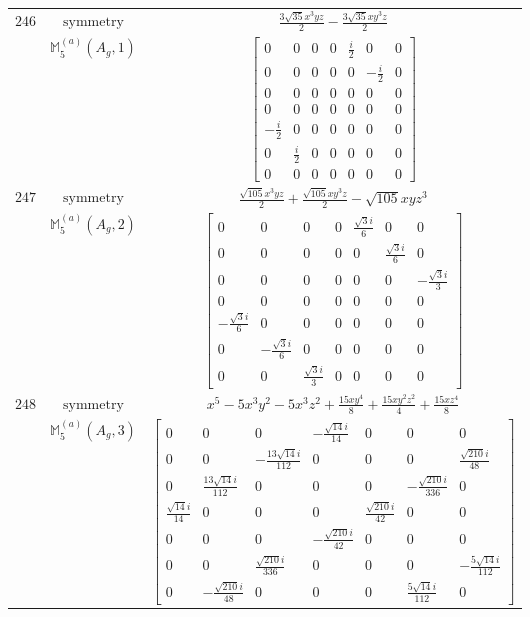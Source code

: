\documentclass[fleqn,8pt,landscape]{jsarticle}
\begin{document}
\begin{longtable}{ccc}
$ 246 $ & $ \text{symmetry} $ & $ \frac{3 \sqrt{35} x^{3} y z}{2} - \frac{3 \sqrt{35} x y^{3} z}{2} $ \\
$  $ & $ \mathbb{M}_{5}^{(a)}(A_{g},1) $ & $ \begin{bmatrix} 0 & 0 & 0 & 0 & \frac{i}{2} & 0 & 0 \\ 0 & 0 & 0 & 0 & 0 & - \frac{i}{2} & 0 \\ 0 & 0 & 0 & 0 & 0 & 0 & 0 \\ 0 & 0 & 0 & 0 & 0 & 0 & 0 \\ - \frac{i}{2} & 0 & 0 & 0 & 0 & 0 & 0 \\ 0 & \frac{i}{2} & 0 & 0 & 0 & 0 & 0 \\ 0 & 0 & 0 & 0 & 0 & 0 & 0 \end{bmatrix} $ \\ \hline
$ 247 $ & $ \text{symmetry} $ & $ \frac{\sqrt{105} x^{3} y z}{2} + \frac{\sqrt{105} x y^{3} z}{2} - \sqrt{105} x y z^{3} $ \\
$  $ & $ \mathbb{M}_{5}^{(a)}(A_{g},2) $ & $ \begin{bmatrix} 0 & 0 & 0 & 0 & \frac{\sqrt{3} i}{6} & 0 & 0 \\ 0 & 0 & 0 & 0 & 0 & \frac{\sqrt{3} i}{6} & 0 \\ 0 & 0 & 0 & 0 & 0 & 0 & - \frac{\sqrt{3} i}{3} \\ 0 & 0 & 0 & 0 & 0 & 0 & 0 \\ - \frac{\sqrt{3} i}{6} & 0 & 0 & 0 & 0 & 0 & 0 \\ 0 & - \frac{\sqrt{3} i}{6} & 0 & 0 & 0 & 0 & 0 \\ 0 & 0 & \frac{\sqrt{3} i}{3} & 0 & 0 & 0 & 0 \end{bmatrix} $ \\ \hline
$ 248 $ & $ \text{symmetry} $ & $ x^{5} - 5 x^{3} y^{2} - 5 x^{3} z^{2} + \frac{15 x y^{4}}{8} + \frac{15 x y^{2} z^{2}}{4} + \frac{15 x z^{4}}{8} $ \\
$  $ & $ \mathbb{M}_{5}^{(a)}(A_{g},3) $ & $ \begin{bmatrix} 0 & 0 & 0 & - \frac{\sqrt{14} i}{14} & 0 & 0 & 0 \\ 0 & 0 & - \frac{13 \sqrt{14} i}{112} & 0 & 0 & 0 & \frac{\sqrt{210} i}{48} \\ 0 & \frac{13 \sqrt{14} i}{112} & 0 & 0 & 0 & - \frac{\sqrt{210} i}{336} & 0 \\ \frac{\sqrt{14} i}{14} & 0 & 0 & 0 & \frac{\sqrt{210} i}{42} & 0 & 0 \\ 0 & 0 & 0 & - \frac{\sqrt{210} i}{42} & 0 & 0 & 0 \\ 0 & 0 & \frac{\sqrt{210} i}{336} & 0 & 0 & 0 & - \frac{5 \sqrt{14} i}{112} \\ 0 & - \frac{\sqrt{210} i}{48} & 0 & 0 & 0 & \frac{5 \sqrt{14} i}{112} & 0 \end{bmatrix} $ \\ \hline

\end{longtable}
\end{document}
